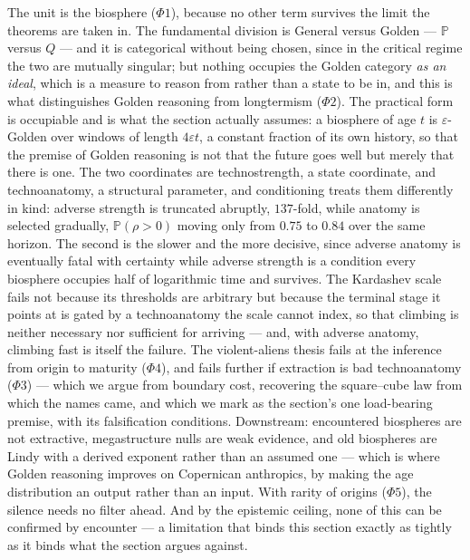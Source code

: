 \documentclass[11pt]{article}
\numberwithin{equation}{section}
\theoremstyle{plain}
\theoremstyle{definition}
\theoremstyle{remark}
\newcommand{\PP}{\mathbb{P}}
\begin{document}
The unit is the biosphere ($\Phi1$), because no other term survives the
limit the theorems are taken in. The fundamental division is General
versus Golden --- $\PP$ versus $Q$ --- and it is categorical without
being chosen, since in the critical regime the two are mutually
singular; but nothing occupies
the Golden category \emph{as an ideal}, which is a measure to reason
from rather than a state to be in, and this is what distinguishes Golden
reasoning from longtermism ($\Phi2$). The practical form is occupiable
and is what the section actually assumes: a biosphere of age $t$ is
$\varepsilon$-Golden over windows of length $4\varepsilon t$, a constant
fraction of its own history, so that the premise of Golden reasoning is
not that the future goes well but merely that there is one. The two coordinates are technostrength, a
state coordinate, and technoanatomy, a structural parameter, and
conditioning treats them differently in kind: adverse strength is
truncated abruptly, $137$-fold, while anatomy is selected gradually,
$\PP(\rho>0)$ moving only from $0.75$ to $0.84$ over the same horizon.
The second is the slower and the more decisive, since adverse anatomy is
eventually fatal with certainty while adverse strength is a condition
every biosphere occupies half of logarithmic time and survives. The Kardashev scale fails not because its
thresholds are arbitrary but because the terminal stage it points at is
gated by a technoanatomy the scale cannot index, so that climbing is
neither necessary nor sufficient for arriving --- and, with adverse
anatomy, climbing fast is itself the failure. The violent-aliens thesis fails at the
inference from origin to maturity ($\Phi4$), and fails further if
extraction is bad technoanatomy ($\Phi3$) --- which we argue from
boundary cost, recovering the square--cube law from which the names
came, and which we mark as the section's one load-bearing premise, with
its falsification conditions. Downstream: encountered biospheres are not
extractive, megastructure nulls are weak evidence, and old biospheres
are Lindy with a derived exponent rather than an assumed one --- which
is where Golden reasoning improves on Copernican anthropics, by making
the age distribution an output rather than an input. With rarity of
origins ($\Phi5$), the silence needs no filter ahead. And by the
epistemic ceiling, none of this can be confirmed by encounter --- a
limitation that binds this section exactly as tightly as it binds what
the section argues against.

\end{document}
